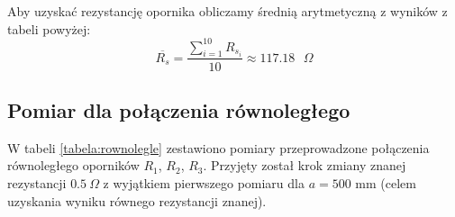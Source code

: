 \documentclass[a4paper,12pts]{article}
\begin{document}
	\begin{table}[!h]
		\centering
		\caption{Wyniki pomiarów dla połączenia szeregowego}
		\label{tabela:szeregowe}
	\end{table}
	
	Aby uzyskać rezystancję opornika obliczamy średnią arytmetyczną z wyników z tabeli powyżej:
	\begin{equation}
	\overline{R_{s}} = \frac{\sum_{i = 1}^{10} R_{{s}_i}}{10} \approx 117.18 \textrm{ $\Omega$}
	\end{equation}
	
	
	\subsection{Pomiar dla połączenia równoległego}
	W tabeli \ref{tabela:rownolegle} zestawiono pomiary przeprowadzone połączenia równoległego oporników $R_1$, $R_2$, $R_3$. Przyjęty został krok zmiany znanej rezystancji $0.5 ~\Omega$ z wyjątkiem pierwszego pomiaru dla $a = 500$ mm (celem uzyskania wyniku równego rezystancji znanej).
	
	\begin{table}[!h]
		\centering
		\caption{Wyniki pomiarów dla połączenia równoległego}
		\label{tabela:rownolegle}
	\end{table}
	
\end{document}
